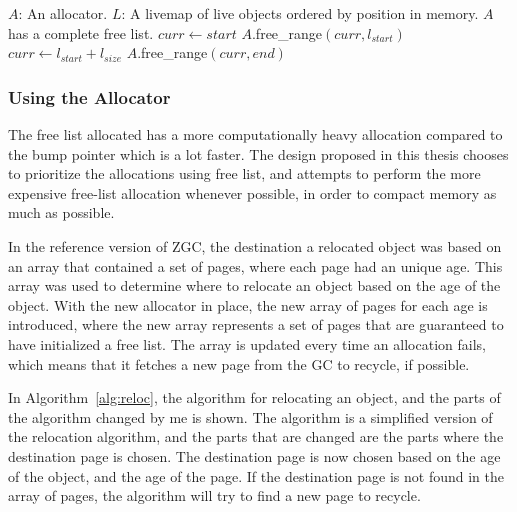 \begin{algorithm}{}
    \caption{$(A,L)$}
    \label{alg:init}
    \begin{algorithmic}[1]
        \Require 
        \Statex $A$: An allocator.
        \Statex $L$: A livemap of live objects ordered by position in memory. 
        \Ensure 
        \Statex $A$ has a complete free list.
        \State $curr\gets start$ 
        \State $A$.free\_range$(curr, l_{start})$ 
        \EndIf
        \State $curr\gets l_{start} + l_{size}$ 
        \EndFor
        \State $A$.free\_range$(curr,end)$ 
    \end{algorithmic}
\end{algorithm}

\subsubsection{Using the Allocator}
The free list allocated has a more computationally heavy allocation compared to the bump pointer which is a lot faster. The design proposed in this thesis chooses to prioritize the allocations using free list, and attempts to perform the more expensive free-list allocation whenever possible, in order to compact memory as much as possible.

In the reference version of ZGC, the destination a relocated object was based on an array that contained a set of pages, where each page had an unique age. This array was used to determine where to relocate an object based on the age of the object. With the new allocator in place, the new array of pages for each age is introduced, where the new array represents a set of pages that are guaranteed to have initialized a free list. The array is updated every time an allocation fails, which means that it fetches a new page from the GC to recycle, if possible.

In Algorithm~\ref{alg:reloc}, the algorithm for relocating an object, and the parts of the algorithm changed by me is shown. The algorithm is a simplified version of the relocation algorithm, and the parts that are changed are the parts where the destination page is chosen. The destination page is now chosen based on the age of the object, and the age of the page. If the destination page is not found in the array of pages, the algorithm will try to find a new page to recycle.


